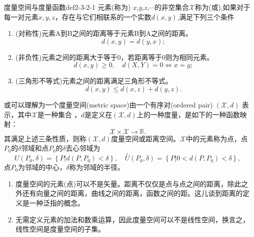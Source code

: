 	\begin{definition}{度量空间与度量函数}{def2-3-2-1}
		元素(称为) $x$,$y$,$z$,$\cdots$的非空集合$\mathscr{X}$称为(或),如果对于每一对元素$x,y,z$，存在与它们相联系的一个实数$d(x,y)$,满足下列三个条件
		\begin{enumerate}
			\item (对称性)元素A到B之间的距离等于元素B到A之间的距离。
			$$d(x,y) = d(y,x);$$
			\item (非负性)元素之间的距离大于等于0，若距离等于0则为相同元素。
			$$ d(x,y) \ge 0, \quad d(X,Y)=0 \Leftrightarrow x=y;$$
			\item  (三角形不等式)元素之间的距离满足三角形不等式。
			$$d(x,y) \le d(x,z)+d(y,z).$$
		\end{enumerate}
		或可以理解为一个度量空间(metric space)由一个有序对(ordered pair) $(\mathscr{X},d)$ 表示，其中$\mathscr{X}$是一种集合
		，$d$是定义在$(\mathscr{X},d)$上的一种度量，是如下的一种函数映射：
		$$ \mathscr{X} \times \mathscr{X} \rightarrow \mathbb{R}.$$
		其满足上述三条性质，则称$(\mathscr{X},d)$度量空间或距离空间。$\mathscr{X}$中的元素称为点，点$P_0$的$\delta$邻域和点$P_0$的$\delta$去心邻域为
		\begin{equation}
		U(P_0,\delta) = \left\{P|d(P,P_0)<\delta \right\},\quad \stackrel{\circ}{U}(P_0,\delta) = \left\{P|0<d(P,P_0)<\delta \right\},
		\end{equation}	
		点$P_0$为邻域的中心，$\delta$称为邻域的半径。
	\end{definition}

	\begin{note}
		\begin{enumerate}
			\item 度量空间的元素(点)可以不是矢量。距离不仅仅是点与点之间的距离，除此之外还有向量之间的距离，曲线之间的距离，函数之间的距。这儿谈到距离的定义是一种泛指的概念。
			\item 无需定义元素的加法和数乘运算，因此度量空间可以不是线性空间，换言之，线性空间是度量空间的子集。
		\end{enumerate}
	\end{note}

